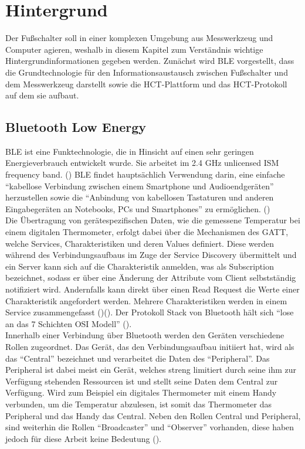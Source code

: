 \section{Hintergrund}
\label{Hintergrund}
Der Fußschalter soll in einer komplexen Umgebung aus Messwerkzeug und Computer agieren, weshalb in diesem Kapitel zum Verständnis wichtige Hintergrundinformationen gegeben werden. Zunächst wird \ac{BLE} vorgestellt, dass die Grundtechnologie für den Informationsaustausch zwischen Fußschalter und dem Messwerkzeug darstellt sowie die \ac{HCT}-Plattform und das \ac{HCT}-Protokoll auf dem sie aufbaut.

\subsection{Bluetooth Low Energy}
\ac{BLE} ist eine Funktechnologie, die in Hinsicht auf einen sehr geringen Energieverbrauch entwickelt wurde. Sie arbeitet im 2.4 GHz unlicensed \ac{ISM} frequency band. (\cite[]{Bluetooth_Wireless_Technology}) \ac{BLE} findet hauptsächlich Verwendung darin, eine einfache ``kabellose Verbindung zwischen einem Smartphone und Audioendgeräten'' herzustellen sowie die ``Anbindung von kabellosen Tastaturen und anderen Eingabegeräten an Notebooks, PCs und Smartphones'' zu ermöglichen. (\cite[S. 339]{Grundkurs_mobile_Kommunikation})\\
Die Übertragung von gerätespezifischen Daten, wie die gemessene Temperatur bei einem digitalen Thermometer, erfolgt dabei über die Mechanismen des \ac{GATT}, welche Services, Charakteristiken und deren Values definiert. Diese werden während des Verbindungsaufbaus im Zuge der Service Discovery übermittelt und ein Server kann sich auf die Charakteristik anmelden, was als Subscription bezeichnet, sodass er über eine Änderung der Attribute vom Client selbstständig notifiziert wird. Andernfalls kann direkt über einen Read Request die Werte einer Charakteristik angefordert werden. Mehrere Charakteristiken werden in einem Service zusammengefasst (\cite[S. 1459]{Bluetooth_Core_Specification})(\cite[]{Overview_and_Evaluation_of_BLE}). Der Protokoll Stack von Bluetooth hält sich ``lose an das 7 Schichten OSI Modell'' (\cite[S. 347]{Grundkurs_mobile_Kommunikation}).\\
Innerhalb einer Verbindung über Bluetooth werden den Geräten verschiedene Rollen zugeordnet. Das Gerät, das den Verbindungsaufbau initiiert hat, wird als das ``Central'' bezeichnet und verarbeitet die Daten des ``Peripheral''. Das Peripheral ist dabei meist ein Gerät, welches streng limitiert durch seine ihm zur Verfügung stehenden Ressourcen ist und stellt seine Daten dem Central zur Verfügung. Wird zum Beispiel ein digitales Thermometer mit einem Handy verbunden, um die Temperatur abzulesen, ist somit das Thermometer das Peripheral und das Handy das Central. Neben den Rollen Central und Peripheral, sind weiterhin die Rollen ``Broadcaster'' und ``Observer'' vorhanden, diese haben jedoch für diese Arbeit keine Bedeutung (\cite[S. 1246]{Bluetooth_Core_Specification}).\\
